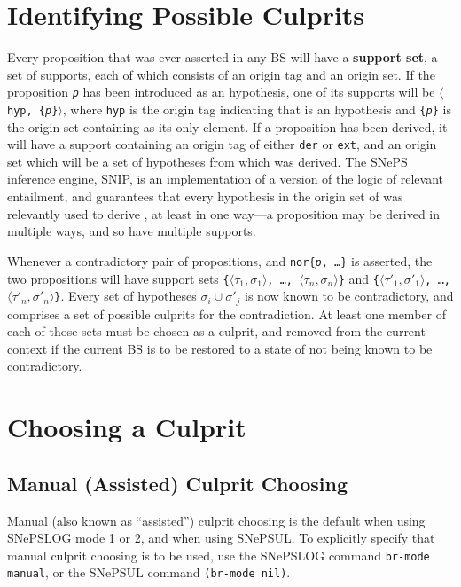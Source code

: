 \documentclass{book}
\makeatletter
\newcommand{\ct}[1]{{\ttfamily #1}} %
\newcommand{\cv}[1]{{\ttfamily{\itshape #1}}} %
\newcommand{\indexct}[1]{\index{#1@\ct{#1}}} %
\makeatother
\begin{document}
\section{Identifying Possible Culprits}
Every proposition that was ever asserted in any BS will have a \textbf{support
  set}, a set of supports, each of which consists of an
origin tag and an origin set.  If the proposition \texttt{\textit{p}} has been
introduced as an hypothesis, one of its supports will be \texttt{$\langle$hyp,
  \{\textit{p}\}$\rangle$}, where \texttt{hyp} is the origin tag indicating that
\cv{p} is an hypothesis and \texttt{\{\textit{p}\}} is the origin set containing
\cv{p} as its only element.  If a proposition \cv{p} has been derived, it will
have a support containing an origin tag of either \texttt{der} or \texttt{ext},
and an origin set which will be a set of hypotheses from which \cv{p} was
derived.  The SNePS inference engine, SNIP, is an implementation of a version of
the logic of relevant entailment, and guarantees that every hypothesis in the
origin set of \cv{p} was relevantly used to derive \cv{p}, at least in one
way---a proposition may be derived in multiple ways, and so have multiple
supports.

Whenever a contradictory pair of propositions, \cv{p} and
\texttt{nor\{\textit{p}, \ldots\}} is asserted, the two propositions will have
support sets \texttt{\{$\langle\tau_1, \sigma_1\rangle$, \ldots, $\langle\tau_n,
  \sigma_n\rangle$\}} and \texttt{\{$\langle\tau\prime_1,
  \sigma\prime_1\rangle$, \ldots,} \texttt{$\langle\tau\prime_n,
  \sigma\prime_n\rangle$\}}.  Every set of hypotheses $\sigma_i \cup
\sigma\prime_j$ is now known to be contradictory, and comprises a set of
possible culprits for the contradiction.  At least one member of each of those
sets must be chosen as a culprit, and removed from the current context if the
current BS is to be restored to a state of not being known to be contradictory.

\section{Choosing a Culprit}\label{sec:culpritChoosing}
\subsection{ Manual (Assisted) Culprit Choosing}

Manual (also known as ``assisted'') culprit choosing is the default when using
SNePSLOG mode 1 or 2, and when using SNePSUL.  To explicitly specify that manual
culprit choosing is to be used, use the SNePSLOG command \texttt{br-mode
  manual}\indexct{br-mode}, or the SNePSUL command \texttt{(br-mode
  nil)}\indexct{br-mode}.
\end{document}
